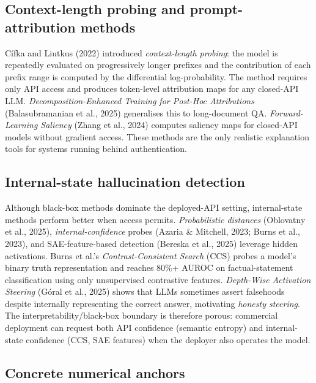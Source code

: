 \subsection{Context-length probing and prompt-attribution methods}\label{context-length-probing-and-prompt-attribution-methods}

Cífka and Liutkus (2022) introduced \emph{context-length probing}: the model is repeatedly evaluated on progressively longer prefixes and the contribution of each prefix range is computed by the differential log-probability. The method requires only API access and produces token-level attribution maps for any closed-API LLM. \emph{Decomposition-Enhanced Training for Post-Hoc Attributions} (Balasubramanian et al., 2025) generalises this to long-document QA. \emph{Forward-Learning Saliency} (Zhang et al., 2024) computes saliency maps for closed-API models without gradient access. These methods are the only realistic explanation tools for systems running behind authentication.

\subsection{Internal-state hallucination detection}\label{internal-state-hallucination-detection}

Although black-box methods dominate the deployed-API setting, internal-state methods perform better when access permits. \emph{Probabilistic distances} (Oblovatny et al., 2025), \emph{internal-confidence} probes (Azaria \& Mitchell, 2023; Burns et al., 2023), and SAE-feature-based detection (Bereska et al., 2025) leverage hidden activations. Burns et al.'s \emph{Contrast-Consistent Search} (CCS) probes a model's binary truth representation and reaches 80\%+ AUROC on factual-statement classification using only unsupervised contrastive features. \emph{Depth-Wise Activation Steering} (Góral et al., 2025) shows that LLMs sometimes assert falsehoods despite internally representing the correct answer, motivating \emph{honesty steering}. The interpretability/black-box boundary is therefore porous: commercial deployment can request both API confidence (semantic entropy) and internal-state confidence (CCS, SAE features) when the deployer also operates the model.

\subsection{Concrete numerical anchors}\label{concrete-numerical-anchors-1}


